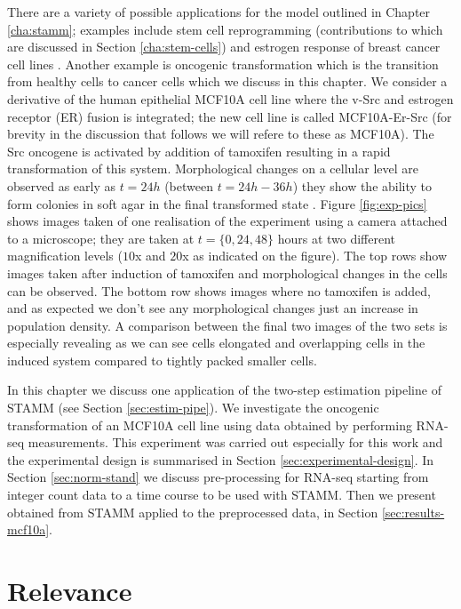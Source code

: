 There are a variety of possible applications for the model outlined in Chapter \ref{cha:stamm}; examples include stem cell reprogramming \citep{Armond:2013} (contributions to which are discussed in Section \ref{cha:stem-cells}) and estrogen response of breast cancer cell lines \citep{Casale:2013}. Another example is oncogenic transformation which is the transition from healthy cells to cancer cells which we discuss in this chapter. We consider a derivative of the human epithelial MCF10A cell line where the v-Src and estrogen receptor (ER) fusion is integrated; the new cell line is called MCF10A-Er-Src \citep{Hirsch:2010ec} (for brevity in the discussion that follows we will refere to these as MCF10A). The Src oncogene is activated by addition of tamoxifen resulting in a rapid transformation of this system. Morphological changes on a cellular level are observed as early as $t=24h$ (between $t=24h-36h$) they show the ability to form colonies in soft agar in the final transformed state \citep{Hirsch:2010ec}. Figure \ref{fig:exp-pics} shows images taken of one realisation of the experiment using a camera attached to a microscope; they are taken at $t= \lbrace 0, 24, 48 \rbrace$ hours at two different magnification levels ($10$x and $20$x as indicated on the figure). The top rows show images taken after induction of tamoxifen and morphological changes in the cells can be observed. The bottom row shows images where no tamoxifen is added, and as expected we don't see any morphological changes just an increase in population density. A comparison between the final two images of the two sets is especially revealing as we can see cells elongated and overlapping cells in the induced system compared to tightly packed smaller cells.

In this chapter we discuss one application of the two-step estimation pipeline of STAMM (see Section \ref{sec:estim-pipe}). We investigate the oncogenic transformation of an MCF10A cell line using  data obtained by performing RNA-seq measurements. This experiment was carried out especially for this work and the experimental design is summarised in Section \ref{sec:experimental-design}. In Section \ref{sec:norm-stand} we discuss pre-processing for RNA-seq starting from integer count data to a time course to be used with STAMM. Then we present obtained from STAMM applied to the preprocessed data, in Section \ref{sec:results-mcf10a}.

\section{Relevance}
\label{sec:relevance}

